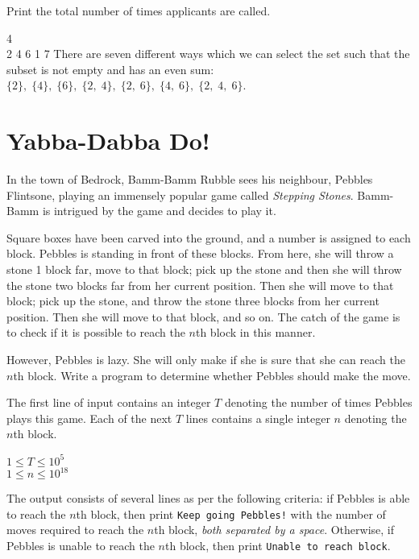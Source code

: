 \outputformat
Print the total number of times applicants are called.

\pushnewpage

\addsampleExplanation
{
4\\
2 4 6 1
}
{
7
}
{
There are seven different ways which we can select the set such that the subset is not empty and has an even sum: $\{2\},\;\{4\},\;\{6\},\;\{2,\;4\},\;\{2,\;6\},\;\{4,\;6\},\;\{2,\;4,\;6\}$.
}


\newpage
\section{Yabba-Dabba Do!}
In the town of Bedrock, Bamm-Bamm Rubble sees his neighbour, Pebbles Flintsone, playing an immensely popular game called \textit{Stepping Stones}. Bamm-Bamm is intrigued by the game and decides to play it.

Square boxes have been carved into the ground, and a number is assigned to each block. Pebbles is standing in front of these blocks. From here, she will throw a stone 1 block far, move to that block; pick up the stone and then she will throw the stone two blocks far from her current position. Then she will move to that block; pick up the stone, and throw the stone three blocks from her current position. Then she will move to that block, and so on. The catch of the game is to check if it is possible to reach the $n$th block in this manner.

However, Pebbles is lazy. She will only make if she is sure that she can reach the $n$th block. Write a program to determine whether Pebbles should make the move.

The first line of input contains an integer $T$ denoting the number of times Pebbles plays this game. Each of the next $T$ lines contains a single integer $n$ denoting the $n$th block.

\constraints
$1 \leq T \leq 10^5$\\
$1 \leq n \leq 10^{18}$

\outputformat
The output consists of several lines as per the following criteria: if Pebbles is able to reach the $n$th block, then print \texttt{Keep going Pebbles!} with the number of moves required to reach the $n$th block, \textit{both separated by a space}. Otherwise, if Pebbles is unable to reach the $n$th block, then print \texttt{Unable to reach block}.

\pushnewpage




